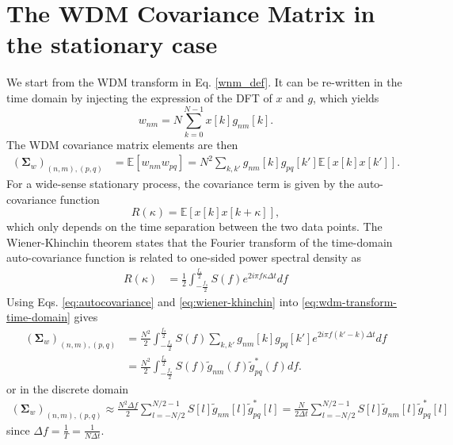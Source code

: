 \documentclass[twocolumn,preprintnumbers,
  superscriptaddress,
  nofootinbib,
  amsmath,
  amssymb,
  aps,
  prd,
  colorlinks=true,
  linkcolor=blue,
  urlcolor=blue,
  citecolor=blue,
  anchorcolor=blue
]{revtex4-2}
\begin{document}
\section{The WDM Covariance Matrix in the stationary case}\label{app:stats}


We start from the WDM transform in Eq. \eqref{wnm_def}. It can be re-written in the time domain by injecting the expression of the DFT of $x$ and $g$, which yields
\begin{equation}
\label{eq:wdm-transform-time-domain}
    w_{nm} = N \sum_{k=0}^{N-1} x[k] g_{nm}[k].
\end{equation}
The WDM covariance matrix elements are then
\begin{align}
(\boldsymbol{\Sigma}_w)_{(n,m),(p,q)} &= \mathbb{E}[w_{nm}w_{pq}] = N^2 \sum_{k,k'}g_{nm}[k]g_{pq}[k']\mathbb{E}[x[k]x[k']].
\end{align}
For a wide-sense stationary process, the covariance term is given by the auto-covariance function
\begin{equation}
\label{eq:autocovariance}
R(\kappa) = \mathbb{E}[x[k]x[k+\kappa]],
\end{equation}
which only depends on the time separation between the two data points.
The Wiener-Khinchin theorem states that the Fourier transform of the
time-domain auto-covariance function is related to one-sided power spectral density as
\begin{align}
\label{eq:wiener-khinchin}
    R(\kappa) &= \frac{1}{2}\int_{-\frac{f_s}{2}}^{\frac{f_s}{2}} S(f) e^{2 i \pi f \kappa \Delta t } df
\end{align}
%
Using Eqs. \eqref{eq:autocovariance} and \eqref{eq:wiener-khinchin} into \eqref{eq:wdm-transform-time-domain} gives
\begin{align}
(\boldsymbol{\Sigma}_w)_{(n,m),(p,q)} &=  \frac{N^2}{2}\int_{-\frac{f_s}{2}}^{\frac{f_s}{2}} S(f)  \sum_{k,k'}g_{nm}[k]g_{pq}[k'] e^{2 i \pi f (k'-k) \Delta t } df \\
& = \frac{N^2}{2}\int_{-\frac{f_s}{2}}^{\frac{f_s}{2}} S(f) \tilde{g}_{nm}(f) \tilde{g}_{pq}^{*}(f) df.
\end{align}
%
or in the discrete domain
%
\begin{align}
(\boldsymbol{\Sigma}_w)_{(n,m),(p,q)} \approx \frac{N^2\Delta f}{2}\sum_{l=-N/2}^{N/2 - 1} S[l]\tilde{g}_{nm}[l] \tilde{g}_{pq}^{*}[l]=\frac{N}{2\Delta t}\sum_{l=-N/2}^{N/2 - 1} S[l]\tilde{g}_{nm}[l] \tilde{g}_{pq}^{*}[l]
\end{align}
%
since $\Delta f=\frac{1}{T}=\frac{1}{N\Delta t}$.
\end{document}
